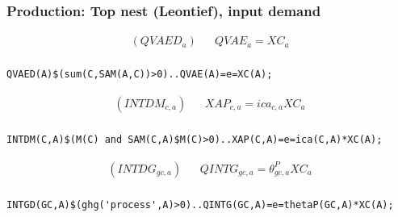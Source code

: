 \documentclass[10pt,compress,slidetop,%
			   hyperref={unicode},xcolor={svgnames},%
			   t]{beamer}
\begin{document}
\begin{frame}[fragile]
\frametitle{Production: Top nest (Leontief), input demand}
\begin{scriptsize}
\begin{eqnarray*}
(QVAED_a)& & QVAE_a=XC_a\\
\end{eqnarray*}
\begin{verbatim}
QVAED(A)$(sum(C,SAM(A,C))>0)..QVAE(A)=e=XC(A);
\end{verbatim}

\begin{eqnarray*}
(INTDM_{c,a})& & XAP_{c,a}=ica_{c,a}XC_a\\
\end{eqnarray*}
\begin{verbatim}
INTDM(C,A)$(M(C) and SAM(C,A)$M(C)>0)..XAP(C,A)=e=ica(C,A)*XC(A);
\end{verbatim}

\begin{eqnarray*}
(INTDG_{gc,a})& & QINTG_{gc,a}=\theta^P_{gc,a}XC_a\\
\end{eqnarray*}
\begin{verbatim}
INTGD(GC,A)$(ghg('process',A)>0)..QINTG(GC,A)=e=thetaP(GC,A)*XC(A);
\end{verbatim}



\end{scriptsize}
\end{frame}
\end{document}
